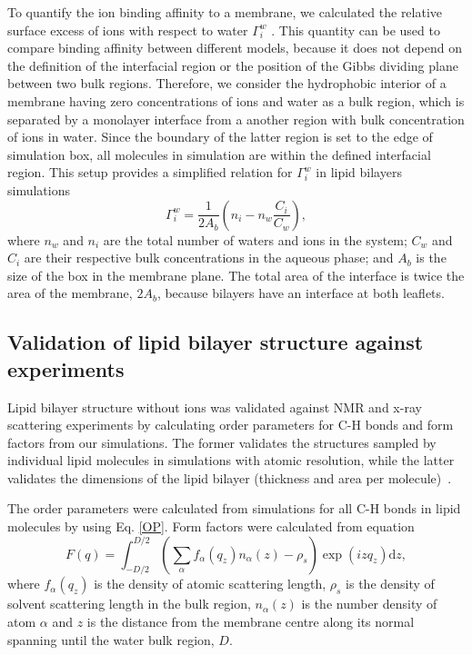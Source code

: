 \documentclass[aip,jcp,twocolumn]{revtex4}
\begin{document}
To quantify the ion binding affinity to a membrane, we
calculated the relative surface excess of ions with respect to water $\Gamma_i^w$  \cite{chattorajBOOK}.
This quantity can be used to compare binding affinity between different models,
because it does not depend on the definition of the interfacial region
or the position of the Gibbs dividing plane between two bulk regions.
Therefore, we consider the hydrophobic interior of a membrane having zero concentrations of ions and water
as a bulk region, which is separated by a monolayer interface from 
a another region with bulk concentration of ions in water.
Since the boundary of the latter region is set to the edge of simulation box,
all molecules in simulation are within the defined interfacial region. 
This setup provides a simplified relation for $\Gamma_i^w$ in lipid bilayers simulations 
\begin{equation}\label{surfexcess}
  \Gamma_i^w=\frac{1}{2A_b} \left ( n_i - n_w \frac{C_i}{C_w} \right ) ,
\end{equation}
where $n_w$ and $n_i$ are the total number of waters and ions in the system;
$C_w$ and $C_i$ are their respective bulk concentrations in the aqueous phase;
and $A_b$ is the size of the box in the membrane plane.
The total area of the interface is twice the area of the membrane, $2A_b$,
because bilayers have an interface at both leaflets.



\subsection{Validation of lipid bilayer structure against experiments}

Lipid bilayer structure without ions was validated against NMR and 
\mbox{x-ray} scattering experiments by calculating order parameters
for C-H bonds and form factors from our simulations. The former validates the structures sampled by individual
lipid molecules in simulations with atomic resolution, while the latter
validates the dimensions of the lipid bilayer (thickness and area per
molecule)~\cite{ollila16}.

The order parameters were calculated from simulations for all C-H bonds
in lipid molecules by using Eq. \ref{OP}. Form factors were calculated 
from equation
\begin{equation}
  F(q) = \int _{-D/2} ^{D/2} \left ( \sum _\alpha f_\alpha (q_z) n_\alpha (z) - \rho _s \right ) \exp (izq_z) \mathrm{d}z,
\end{equation}
where $f_\alpha(q_z)$ is the density of atomic scattering length, 
$\rho_s$ is the density of solvent scattering length in the bulk region,
$n_\alpha (z)$ is the number density of atom $\alpha$ and
$z$ is the distance from the membrane centre along its normal 
spanning until the water bulk region, $D$. 
\end{document}
